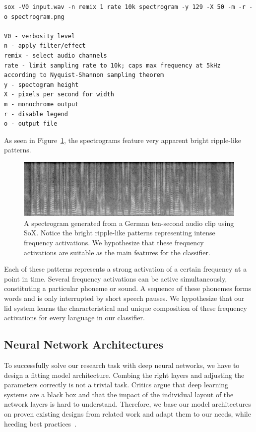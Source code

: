 	\begin{listing}[tp]
	\begin{lstlisting}[caption={SoX command and options used for generating monochrome spectrograms. All audio files were discretized into \num{129}~frequency buckets using a constant pixel width per time step, resulting in spectrogram images of $500 \times 129$ pixels.}, label={lst:spectrograms}]
sox -V0 input.wav -n remix 1 rate 10k spectrogram -y 129 -X 50 -m -r -o spectrogram.png

V0 - verbosity level 
n - apply filter/effect
remix - select audio channels
rate - limit sampling rate to 10k; caps max frequency at 5kHz according to Nyquist-Shannon sampling theorem
y - spectogram height
X - pixels per second for width
m - monochrome output
r - disable legend
o - output file
    \end{lstlisting}
    \end{listing}

	As seen in Figure~\ref{fig:spectrogram}, the spectrograms feature very apparent bright ripple-like patterns.
%
	\begin{figure}[tp]
  		\centering
    	\includegraphics[width=\textwidth,keepaspectratio]{img/spectrogram.png}
    	\caption{A spectrogram generated from a German ten-second audio clip using SoX. Notice the bright ripple-like patterns representing intense frequency activations. We hypothesize that these frequency activations are suitable as the main features for the classifier.}
    	\label{fig:spectrogram}
	\end{figure}
%
	Each of these patterns represents a strong activation of a certain frequency at a point in time. Several frequency activations can be active simultaneously, constituting a particular phoneme or sound. A sequence of these phonemes forms words and is only interrupted by short speech pauses. We hypothesize that our \ac{lid} system learns the characteristical and unique composition of these frequency activations for every language in our classifier.

\subsection{Neural Network Architectures}
\label{sec:cnn_architecture}
To successfully solve our research task with deep neural networks, we have to design a fitting model architecture. Combing the right layers and adjusting the parameters correctly is not a trivial task. Critics argue that deep learning systems are a black box and that the impact of the individual layout of the network layers is hard to understand. Therefore, we base our model architectures on proven existing designs from related work and adapt them to our needs, while heeding best practices~\cite{mishkin2016systematic, szegedy2016rethinking}.

